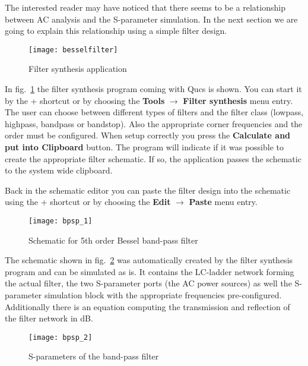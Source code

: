 
The interested reader may have noticed that there seems to be a
relationship between AC analysis and the S-parameter simulation.  In
the next section we are going to explain this relationship using a
simple filter design.

\begin{figure}[ht]
  \centering
  \texttt{[image: besselfilter]}
  \caption{Filter synthesis application}
  \label{fig:besselfilter}
\end{figure}
\FloatBarrier

In fig.~\ref{fig:besselfilter} the filter synthesis program coming
with Qucs is shown.  You can start it by the \Ctrl+
shortcut or by choosing the \textbf{Tools} $\rightarrow$
\textbf{Filter synthesis} menu entry.  The user can choose between
different types of filters and the filter class (lowpass, highpass,
bandpass or bandstop).  Also the appropriate corner frequencies and
the order must be configured.  When setup correctly you press the
\textbf{Calculate and put into Clipboard} button.  The program will
indicate if it was possible to create the appropriate filter
schematic.  If so, the application passes the schematic to the system
wide clipboard.

\medskip

Back in the schematic editor you can paste the filter design into the
schematic using the \Ctrl+ shortcut or by choosing the
\textbf{Edit} $\rightarrow$ \textbf{Paste} menu entry.

\begin{figure}[ht]
  \centering
  \texttt{[image: bpsp\_1]}
  \caption{Schematic for 5th order Bessel band-pass filter}
  \label{fig:bpsp_1}
\end{figure}
\FloatBarrier

The schematic shown in fig.~\ref{fig:bpsp_1} was automatically created
by the filter synthesis program and can be simulated as is.  It
contains the LC-ladder network forming the actual filter, the two
S-parameter ports (the AC power sources) as well the S-parameter
simulation block with the appropriate frequencies pre-configured.
Additionally there is an equation computing the transmission and
reflection of the filter network in dB.

\begin{figure}[ht]
  \centering
  \texttt{[image: bpsp\_2]}
  \caption{S-parameters of the band-pass filter}
  \label{fig:bpsp_2}
\end{figure}
\FloatBarrier

